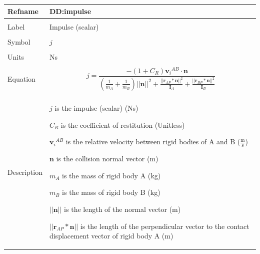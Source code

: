 \documentclass[12pt]{article}
\begin{document}
\noindent \begin{minipage}{\textwidth}
\begin{tabular}{p{} p{}}
\toprule \textbf{Refname} & \textbf{DD:impulse}
\label{DD:impulse}
\\ \midrule \\
Label & Impulse (scalar)
        \\ \midrule \\
        Symbol & $j$
                 \\ \midrule \\
                 Units & Ns
                         \\ \midrule \\
                         Equation & \begin{displaymath}
                                    j=\frac{-\left(1+{C_{R}}\right) {{\mathbf{v}_{i}}^{AB}}\cdot{}\mathbf{n}}{\left(\frac{1}{{m_{A}}}+\frac{1}{{m_{B}}}\right) ||\mathbf{n}||^{2}+\frac{||{\mathbf{r}_{AP}}*\mathbf{n}||^{2}}{{\mathbf{I}_{A}}}+\frac{||{\mathbf{r}_{BP}}*\mathbf{n}||^{2}}{{\mathbf{I}_{B}}}}
                                    \end{displaymath}
                                    \\ \midrule \\
                                    Description & \begin{symbDescription}
                                                  \item{$j$ is the impulse (scalar) (Ns)}
                                                  \item{${C_{R}}$ is the coefficient of restitution (Unitless)}
                                                  \item{${{\mathbf{v}_{i}}^{AB}}$ is the relative velocity between rigid bodies of A and B ($\frac{\text{m}}{\text{s}}$)}
                                                  \item{$\mathbf{n}$ is the collision normal vector (m)}
                                                  \item{${m_{A}}$ is the mass of rigid body A (kg)}
                                                  \item{${m_{B}}$ is the mass of rigid body B (kg)}
                                                  \item{$||\mathbf{n}||$ is the length of the normal vector (m)}
                                                  \item{$||{\mathbf{r}_{AP}}*\mathbf{n}||$ is the length of the perpendicular vector to the contact displacement vector of rigid body A (m)}

\end{symbDescription}
\end{tabular}
\end{minipage}
\end{document}
